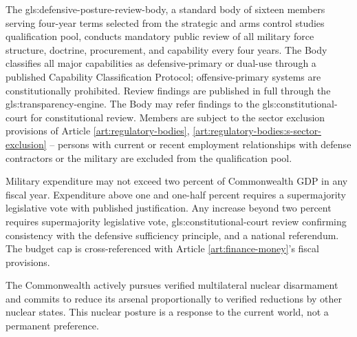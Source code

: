 The \gls{gls:defensive-posture-review-body}, a standard body of sixteen members serving four-year terms selected from the strategic and arms control studies qualification pool, conducts mandatory public review of all military force structure, doctrine, procurement, and capability every four years. The Body classifies all major capabilities as defensive-primary or dual-use through a published Capability Classification Protocol; offensive-primary systems are constitutionally prohibited. Review findings are published in full through the \gls{gls:transparency-engine}. The Body may refer findings to the \gls{gls:constitutional-court} for constitutional review. Members are subject to the sector exclusion provisions of Article \ref{art:regulatory-bodies}, \ref{art:regulatory-bodies:s-sector-exclusion} -- persons with current or recent employment relationships with defense contractors or the military are excluded from the qualification pool.

Military expenditure may not exceed two percent of Commonwealth GDP in any fiscal year. Expenditure above one and one-half percent requires a supermajority legislative vote with published justification. Any increase beyond two percent requires supermajority legislative vote, \gls{gls:constitutional-court} review confirming consistency with the defensive sufficiency principle, and a national referendum. The budget cap is cross-referenced with Article \ref{art:finance-money}'s fiscal provisions.

The Commonwealth actively pursues verified multilateral nuclear disarmament and commits to reduce its arsenal proportionally to verified reductions by other nuclear states. This nuclear posture is a response to the current world, not a permanent preference.